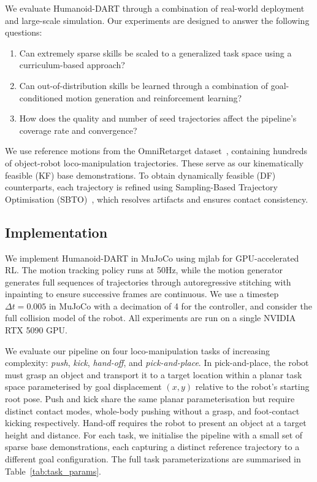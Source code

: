 \documentclass{article}
\newcommand{\papertitle}{Humanoid-DART}
\begin{document}
We evaluate {\papertitle} through a combination of real-world deployment and large-scale simulation. Our experiments are designed to answer the following questions:
\begin{enumerate}\itemsep0em
    \item Can extremely sparse skills be scaled to a generalized task space using a curriculum-based approach?
    \item Can out-of-distribution skills be learned through a combination of goal-conditioned motion generation and reinforcement learning?
    \item How does the quality and number of seed trajectories affect the pipeline's coverage rate and convergence?
\end{enumerate}
We use reference motions from the OmniRetarget dataset~\cite{yang2025omniretargetinteractionpreservingdatageneration}, containing hundreds of object-robot loco-manipulation trajectories. These serve as our kinematically feasible (KF) base demonstrations. To obtain dynamically feasible (DF) counterparts, each trajectory is refined using Sampling-Based Trajectory Optimisation (SBTO)~\cite{dhedin2026dynaretargetdynamicallyfeasibleretargetingusing}, which resolves artifacts and ensures contact consistency. 


\subsection{Implementation}
We implement {\papertitle} in MuJoCo using mjlab \cite{Zakka_mjlab_A_Lightweight_2026} for GPU-accelerated RL. The motion tracking policy runs at 50Hz, while the motion generator generates full sequences of trajectories through autoregressive stitching with inpainting to ensure successive frames are continuous. We use a timestep $\Delta t=0.005$ in MuJoCo with a decimation of 4 for the controller, and consider the full collision model of the robot. All experiments are run on a single NVIDIA RTX 5090 GPU.

We evaluate our pipeline on four loco-manipulation tasks of increasing complexity: \textit{push}, \textit{kick}, \textit{hand-off}, and \textit{pick-and-place}. In pick-and-place, the robot 
must grasp an object and transport it to a target location within a 
planar task space parameterised by goal displacement $(x, y)$ relative to the robot's starting root pose. Push and kick share the same planar parameterisation but require distinct contact modes, 
whole-body pushing without a grasp, and foot-contact kicking 
respectively. Hand-off requires the robot to present an object at a target height and distance.
For each task, we initialise the pipeline with a small set of sparse 
base demonstrations, each capturing a distinct reference trajectory 
to a different goal configuration. The full task parameterizations 
are summarised in Table~\ref{tab:task_params}.
\end{document}
